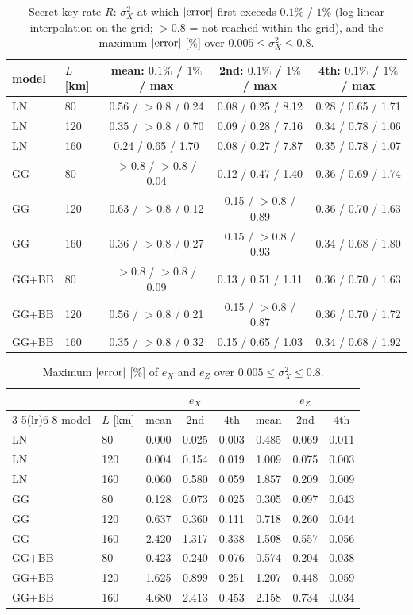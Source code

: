 \documentclass[11pt,a4paper]{article}
\begin{document}
\begin{table}[htbp]\centering\small
\caption{Secret key rate $R$: $\sigma_X^2$ at which $|{\rm error}|$ first exceeds $0.1\%$ / $1\%$ (log-linear interpolation on the grid; $>0.8$ = not reached within the grid), and the maximum $|{\rm error}|$ [\%] over $0.005\le\sigma_X^2\le0.8$.}
\label{tab:thr}
\begin{tabular}{llccc}\toprule
model & $L$ [km] & mean: $0.1\%$ / $1\%$ / max & 2nd: $0.1\%$ / $1\%$ / max & 4th: $0.1\%$ / $1\%$ / max\\\midrule
LN & 80 & 0.56 / $>0.8$ / 0.24 & 0.08 / 0.25 / 8.12 & 0.28 / 0.65 / 1.71 \\
LN & 120 & 0.35 / $>0.8$ / 0.70 & 0.09 / 0.28 / 7.16 & 0.34 / 0.78 / 1.06 \\
LN & 160 & 0.24 / 0.65 / 1.70 & 0.08 / 0.27 / 7.87 & 0.35 / 0.78 / 1.07 \\
\midrule
GG & 80 & $>0.8$ / $>0.8$ / 0.04 & 0.12 / 0.47 / 1.40 & 0.36 / 0.69 / 1.74 \\
GG & 120 & 0.63 / $>0.8$ / 0.12 & 0.15 / $>0.8$ / 0.89 & 0.36 / 0.70 / 1.63 \\
GG & 160 & 0.36 / $>0.8$ / 0.27 & 0.15 / $>0.8$ / 0.93 & 0.34 / 0.68 / 1.80 \\
\midrule
GG+BB & 80 & $>0.8$ / $>0.8$ / 0.09 & 0.13 / 0.51 / 1.11 & 0.36 / 0.70 / 1.63 \\
GG+BB & 120 & 0.56 / $>0.8$ / 0.21 & 0.15 / $>0.8$ / 0.87 & 0.36 / 0.70 / 1.72 \\
GG+BB & 160 & 0.35 / $>0.8$ / 0.32 & 0.15 / 0.65 / 1.03 & 0.34 / 0.68 / 1.92 \\
\bottomrule\end{tabular}\end{table}

\begin{table}[htbp]\centering\small
\caption{Maximum $|{\rm error}|$ [\%] of $e_X$ and $e_Z$ over $0.005\le\sigma_X^2\le0.8$.}
\label{tab:thr2}
\begin{tabular}{llcccccc}\toprule
 & & \multicolumn{3}{c}{$e_X$} & \multicolumn{3}{c}{$e_Z$}\\\cmidrule(lr){3-5}\cmidrule(lr){6-8}
model & $L$ [km] & mean & 2nd & 4th & mean & 2nd & 4th\\\midrule
LN & 80 & 0.000 & 0.025 & 0.003 & 0.485 & 0.069 & 0.011 \\
LN & 120 & 0.004 & 0.154 & 0.019 & 1.009 & 0.075 & 0.003 \\
LN & 160 & 0.060 & 0.580 & 0.059 & 1.857 & 0.209 & 0.009 \\
\midrule
GG & 80 & 0.128 & 0.073 & 0.025 & 0.305 & 0.097 & 0.043 \\
GG & 120 & 0.637 & 0.360 & 0.111 & 0.718 & 0.260 & 0.044 \\
GG & 160 & 2.420 & 1.317 & 0.338 & 1.508 & 0.557 & 0.056 \\
\midrule
GG+BB & 80 & 0.423 & 0.240 & 0.076 & 0.574 & 0.204 & 0.038 \\
GG+BB & 120 & 1.625 & 0.899 & 0.251 & 1.207 & 0.448 & 0.059 \\
GG+BB & 160 & 4.680 & 2.413 & 0.453 & 2.158 & 0.734 & 0.034 \\
\bottomrule\end{tabular}\end{table}
\end{document}
